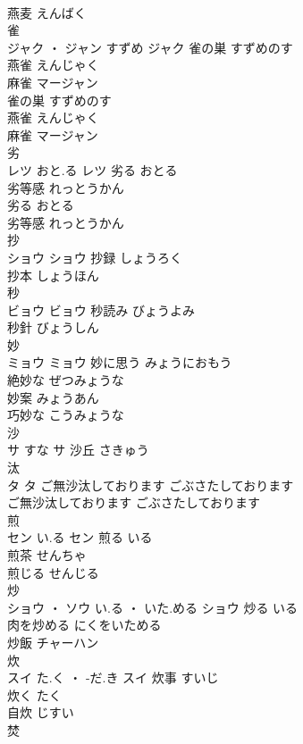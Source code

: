 \documentclass[8pt]{extreport}
\begin{document}
\begin{CJK}{UTF8}{min}
\\	燕麦	えんばく	
\\	雀	
\\	ジャク ・ ジャン	すずめ	ジャク	雀の巣	すずめのす	
\\	燕雀	えんじゃく	
\\	麻雀	マージャン	
\\	雀の巣	すずめのす	
\\	燕雀	えんじゃく	
\\	麻雀	マージャン	
\\	劣	
\\	レツ	おと.る	レツ	劣る	おとる	
\\	劣等感	れっとうかん	
\\	劣る	おとる	
\\	劣等感	れっとうかん	
\\	抄	
\\	ショウ		ショウ	抄録	しょうろく	
\\	抄本	しょうほん	
\\	秒	
\\	ビョウ		ビョウ	秒読み	びょうよみ	
\\	秒針	びょうしん	
\\	妙	
\\	ミョウ		ミョウ	妙に思う	みょうにおもう	
\\	絶妙な	ぜつみょうな	
\\	妙案	みょうあん	
\\	巧妙な	こうみょうな	
\\	沙	
\\	サ	すな	サ													沙丘	さきゅう	
\\	汰	
\\	タ		タ	ご無沙汰しております	ごぶさたしております	
\\	ご無沙汰しております	ごぶさたしております	
\\	煎	
\\	セン	い.る	セン	煎る	いる	
\\	煎茶	せんちゃ	
\\	煎じる	せんじる	
\\	炒	
\\	ショウ ・ ソウ	い.る ・ いた.める	ショウ	炒る	いる	
\\	肉を炒める	にくをいためる	
\\	炒飯	チャーハン	
\\	炊	
\\	スイ	た.く ・ -だ.き	スイ	炊事	すいじ	
\\	炊く	たく	
\\	自炊	じすい	
\\	焚	

\end{CJK}
\end{document}
